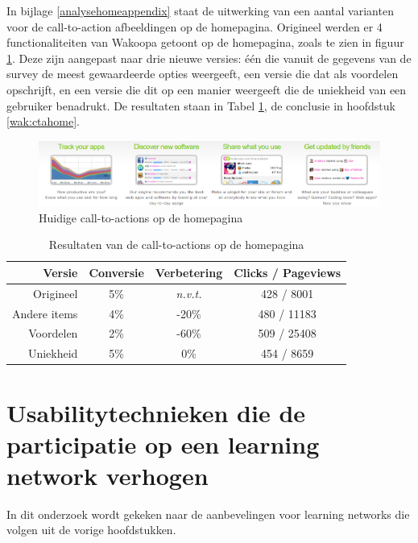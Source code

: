 \documentclass[a4paper, 10pt, pdftex]{report}
\begin{document}
      In bijlage \ref{analysehomeappendix} staat de uitwerking van een aantal varianten voor de call-to-action afbeeldingen op de homepagina. Origineel werden er 4 functionaliteiten van Wakoopa getoont op de homepagina, zoals te zien in figuur \ref{ctahomeimg}. Deze zijn aangepast naar drie nieuwe versies: \'e\'en die vanuit de gegevens van de survey de meest gewaardeerde opties weergeeft, een versie die dat als voordelen opschrijft, en een versie die dit op een manier weergeeft die de uniekheid van een gebruiker benadrukt. De resultaten staan in Tabel \ref{tab:ctahome}, de conclusie in hoofdstuk \ref{wak:ctahome}.
    \begin{figure}
      \begin{center}
        \includegraphics[width=\textwidth]{../images/newhomepage/original}
        \caption{Huidige call-to-actions op de homepagina}
        \label{ctahomeimg}
      \end{center}
    \end{figure}

        \begin{table}[ht]
        \centering
        \begin{tabular}{r|*{3}{c}}
          \textbf{Versie}                   & Conversie  & Verbetering    & Clicks / Pageviews \\ \hline
          Origineel                         & 5\%        & \emph{n.v.t.}  & 428 / 8001\\
          Andere items                      & 4\%        & -20\%          & 480 / 11183\\
          Voordelen                         & 2\%        & -60\%          & 509 / 25408\\
          Uniekheid                         & 5\%        & 0\%            & 454 / 8659\\
        \end{tabular}
        \caption{Resultaten van de call-to-actions op de homepagina}
        \label{tab:ctahome}
        \end{table}

  \newpage
  \chapter{Usabilitytechnieken die de participatie op een learning network verhogen}
    \label{globalchapter}
    In dit onderzoek wordt gekeken naar de aanbevelingen voor learning networks die volgen uit de vorige hoofdstukken.
\end{document}
